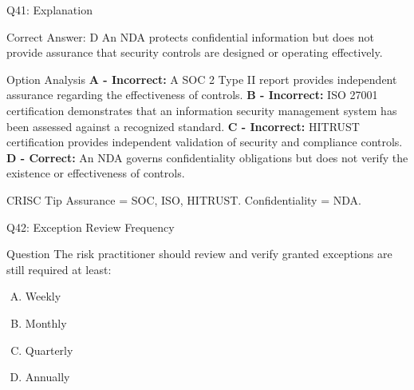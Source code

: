 \documentclass{beamer}
\begin{document}
	
	
	\begin{frame}[shrink=10]{Q41: Explanation} \begin{block}{Correct Answer: D} An NDA protects confidential information but does not provide assurance that security controls are designed or operating effectively. \end{block} \begin{block}{Option Analysis} \textbf{A - Incorrect:} A SOC 2 Type II report provides independent assurance regarding the effectiveness of controls. \vspace{0.15cm} \textbf{B - Incorrect:} ISO 27001 certification demonstrates that an information security management system has been assessed against a recognized standard. \vspace{0.15cm} \textbf{C - Incorrect:} HITRUST certification provides independent validation of security and compliance controls. \vspace{0.15cm} \textbf{D - Correct:} An NDA governs confidentiality obligations but does not verify the existence or effectiveness of controls. \end{block} \begin{block}{CRISC Tip} Assurance = SOC, ISO, HITRUST. Confidentiality = NDA. \end{block} \end{frame}
	
	\begin{frame}{Q42: Exception Review Frequency}
		\begin{block}{Question}
			The risk practitioner should review and verify granted exceptions are still required at least:
		\end{block}
		\begin{enumerate}[(A)]
			\item Weekly
			\item Monthly
			\item Quarterly
			\item Annually
		\end{enumerate}
	\end{frame}
	
\end{document}
